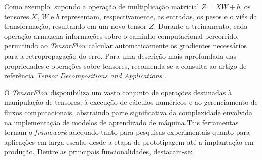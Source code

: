 Como exemplo: supondo a operação de multiplicação matricial $Z = XW + b$, os tensores $X$, $W$ e $b$ representam, respectivamente, as entradas, os pesos e o viés da transformação, resultando em um novo tensor $Z$. Durante o treinamento, cada operação armazena informações sobre o caminho computacional percorrido, permitindo ao \textit{TensorFlow} calcular automaticamente os gradientes necessários para a retropropagação do erro. Para uma descrição mais aprofundada das propriedades e operações sobre tensores, recomenda-se a consulta ao artigo de referência \textit{Tensor Decompositions and Applications} \cite{kolda2009tensor}.

O \textit{TensorFlow} disponibiliza um vasto conjunto de operações destinadas à manipulação de tensores, à execução de cálculos numéricos e ao gerenciamento de fluxos computacionais, abstraindo parte significativa da complexidade envolvida na implementação de modelos de aprendizado de máquina.Tais ferramentas tornam o \textit{framework} adequado tanto para pesquisas experimentais quanto para aplicações em larga escala, desde a etapa de prototipagem até a implantação em produção. Dentre as principais funcionalidades, destacam-se:

